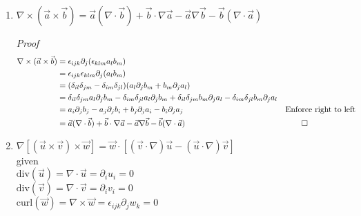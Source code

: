 \documentclass[11pt,twoside]{article}
\renewcommand{\d}{\partial}
\newcommand{\vect}[1]{\vec{#1}}
\newcommand{\grad}{\nabla}
\newcommand{\cross}{\times}
\newcommand{\curl}{\mbox{curl}}
\newcommand{\divf}{\mbox{div}}
\begin{document}
\begin{enumerate}
%
%
\item $\grad\cross(\vect{a}\cross\vect{b}) = \vect{a}(\grad\cdot\vect{b})+\vect{b}\cdot\grad\vect{a}-\vect{a}\grad\vect{b}-\vect{b}(\grad\cdot\vect{a})$

\textit{Proof}
\begin{align*}
\grad\cross(\vect{a}\cross\vect{b}) & = \epsilon_{ijk}\d_j(\epsilon_{klm}a_lb_m)\\
                                    & = \epsilon_{ijk}\epsilon_{klm}\d_j(a_lb_m)\\
                                    & = (\delta_{il}\delta_{jm}-\delta_{im}\delta_{jl})(a_l\d_jb_m+b_m\d_ja_l)\\
                                    & = \delta_{il}\delta_{jm}a_l\d_jb_m-\delta_{im}\delta_{jl}a_l\d_jb_m+ \delta_{il}\delta_{jm}b_m\d_ja_l - \delta_{im}\delta_{jl}b_m\d_ja_l\\
                                    & = a_i\d_jb_j-a_j\d_jb_i+b_j\d_ja_i-b_i\d_ja_j &&\text{Enforce right to left}\\
                                    & = \vect{a}(\grad\cdot\vect{b})+\vect{b}\cdot\grad\vect{a}-\vect{a}\grad\vect{b}-\vect{b}(\grad\cdot\vect{a}) && \qed
\end{align*}

\newpage
%
%
\item $\grad[(\vect{u}\cross\vect{v})\cross\vect{w}] = \vect{w}\cdot[(\vect{v}\cdot\grad)\vect{u}-(\vect{u}\cdot\grad)\vect{v}]$ \\
given \\ 
$\divf(\vect{u})=\grad\cdot\vect{u}=\d_iu_i=0$\\ 
$\divf(\vect{v})=\grad\cdot\vect{v}=\d_iv_i=0$\\ 
$\curl(\vect{w})=\grad\cross\vect{w}=\epsilon_{ijk}\d_jw_k=0$


\end{enumerate}
\end{document}
